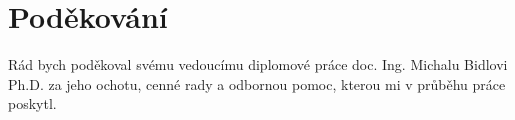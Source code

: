 \documentclass[czech]{ExcelAtFIT} %
\begin{document}
\section*{Poděkování}
Rád bych poděkoval svému vedoucímu diplomové práce doc. Ing. Michalu Bidlovi Ph.D. za jeho ochotu, cenné rady a odbornou pomoc, kterou mi v průběhu práce poskytl.




\end{document}
